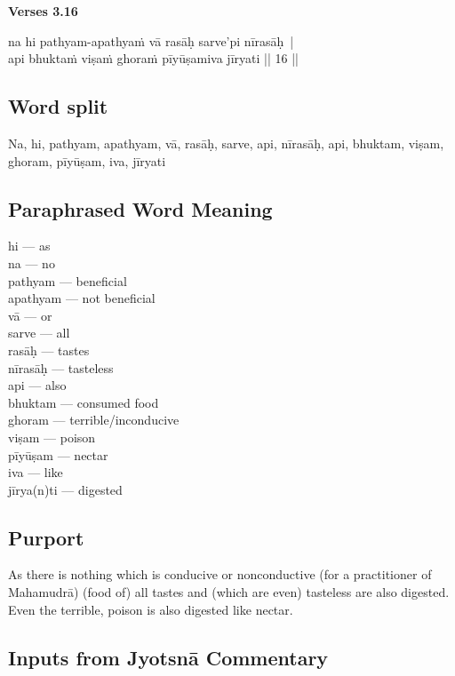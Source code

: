 \noindent \textbf{Verses 3.16}

\begin{shloka}
na hi pathyam-apathyaṁ vā rasāḥ sarve'pi nīrasāḥ |\\ 
api bhuktaṁ viṣaṁ ghoraṁ pīyūṣamiva jīryati || 16 ||
\end{shloka}

\subsection*{Word split}

Na, hi, pathyam, apathyam, vā, rasāḥ, sarve, api, nīrasāḥ, api, bhuktam, viṣam, ghoram, pīyūṣam, iva, jīryati 

\subsection*{Paraphrased Word Meaning}

\begin{multicols}{2}
hi --- as \\
na --- no \\
pathyam --- beneficial \\
apathyam --- not beneficial\\
vā --- or \\
sarve --- all\\
rasāḥ --- tastes \\
nīrasāḥ --- tasteless \\
api --- also \\
bhuktam --- consumed food \\
ghoram --- terrible/inconducive \\
viṣam --- poison \\
pīyūṣam --- nectar \\
iva --- like \\
jīrya(n)ti --- digested 
\end{multicols}

\subsection*{Purport}

As there is nothing which is conducive or nonconductive (for a practitioner of Mahamudrā) (food of)  all tastes and (which are even) tasteless are also digested. Even the terrible, poison is also digested like nectar. 

\subsection*{Inputs from Jyotsnā Commentary}

